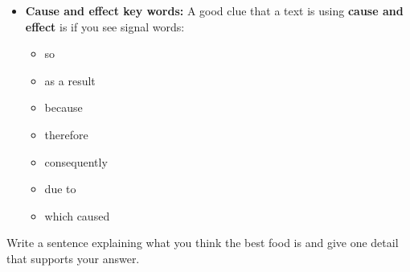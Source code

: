 \documentclass[12pt]{article}
\begin{document}
\vspace{1em}

\begin{tcolorbox}[colframe=black!40, colback=gray!5, 
coltitle=black, colbacktitle=black!20, fonttitle=\bfseries\Large, 
title=Additional Notes, halign title=center, left=5pt, right=5pt, top=5pt, bottom=15pt]

\begin{itemize}
    \item \textbf{Cause and effect key words:} A good clue that a text is using \textbf{cause and effect} is if you see signal words:
    \begin{itemize}
        \item so
        \item as a result
        \item because 
        \item therefore
        \item consequently
        \item due to
        \item which caused
    \end{itemize}
\end{itemize}
\end{tcolorbox}

\vspace{1em}

\begin{tcolorbox}[colframe=black!60, colback=white, 
coltitle=black, colbacktitle=black!15, fonttitle=\bfseries\Large, 
title=Exit Ticket, halign title=center, left=10pt, right=10pt, top=10pt, bottom=15pt]

Write a sentence explaining what you think the best food is and give one detail that supports your answer.

\vspace{2cm} 
\underline{\hspace{15cm}} \\[0.8cm]
\underline{\hspace{15cm}} \\[0.8cm]
\underline{\hspace{15cm}} 
\end{tcolorbox}
\end{document}
